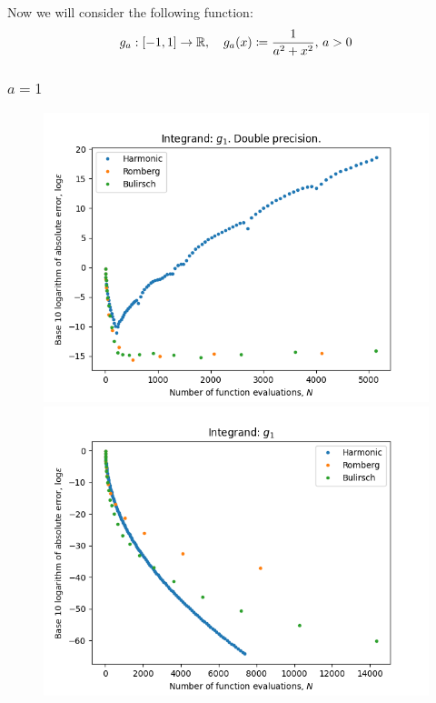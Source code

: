 Now we will consider the following function:
\[
g_a: [-1, 1] \rightarrow \mathbb{R}, \quad g_a(x) \coloneqq \frac{1}{a^2 + x^2},\, a > 0
\]

\subsubsection{\(a = 1\)}

\begin{figure}[H]
\centering
\begin{minipage}{0.45\textwidth}
\centering
\includegraphics[scale=0.45]{../results/romberg_plots/g_one.png}
\end{minipage}
\begin{minipage}{0.45\textwidth}
\centering
\includegraphics[scale=0.45]{../results/romberg_plots/g_one_hp.png}
\end{minipage}
\end{figure}

